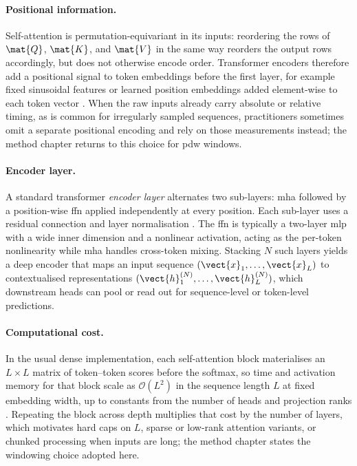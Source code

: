\paragraph{Positional information.}
Self-attention is permutation-equivariant in its inputs: reordering the rows of $\mat{Q}$, $\mat{K}$, and $\mat{V}$ in the same way reorders the output rows accordingly, but does not otherwise encode order.
Transformer encoders therefore add a positional signal to token embeddings before the first layer, for example fixed sinusoidal features or learned position embeddings added element-wise to each token vector \parencite{vaswani2017attention,devlin2019bert}.
When the raw inputs already carry absolute or relative timing, as is common for irregularly sampled sequences, practitioners sometimes omit a separate positional encoding and rely on those measurements instead; the method chapter returns to this choice for \gls{pdw} windows.

\paragraph{Encoder layer.}
A standard transformer \emph{encoder layer} alternates two sub-layers: \gls{mha} followed by a position-wise \gls{ffn} applied independently at every position.
Each sub-layer uses a residual connection and layer normalisation \parencite{vaswani2017attention}.
The \gls{ffn} is typically a two-layer \gls{mlp} with a wide inner dimension and a nonlinear activation, acting as the per-token nonlinearity while \gls{mha} handles cross-token mixing.
Stacking $N$ such layers yields a deep encoder that maps an input sequence $(\vect{x}_1,\ldots,\vect{x}_L)$ to contextualised representations $(\vect{h}^{(N)}_1,\ldots,\vect{h}^{(N)}_L)$, which downstream heads can pool or read out for sequence-level or token-level predictions.

\paragraph{Computational cost.}
In the usual dense implementation, each self-attention block materialises an $L \times L$ matrix of token--token scores before the softmax, so time and activation memory for that block scale as $\mathcal{O}(L^2)$ in the sequence length $L$ at fixed embedding width, up to constants from the number of heads and projection ranks \parencite{vaswani2017attention}.
Repeating the block across depth multiplies that cost by the number of layers, which motivates hard caps on $L$, sparse or low-rank attention variants, or chunked processing when inputs are long; the method chapter states the windowing choice adopted here.
